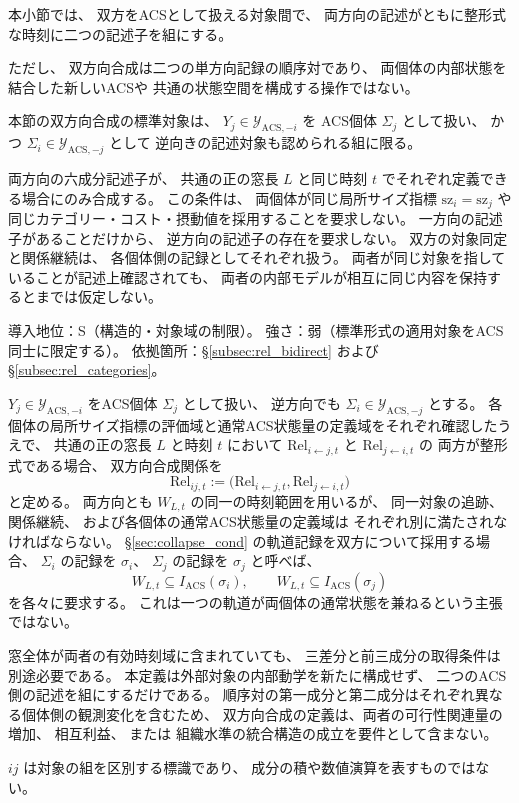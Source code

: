 本小節では、
双方をACSとして扱える対象間で、
両方向の記述がともに整形式な時刻に二つの記述子を組にする。

ただし、
双方向合成は二つの単方向記録の順序対であり、
両個体の内部状態を結合した新しいACSや
共通の状態空間を構成する操作ではない。

\begin{assumption}[双方向合成関係の標準対象]
\label{ass:bidirect_scope}
本節の双方向合成の標準対象は、
$Y_j\in\mathcal Y_{\mathrm{ACS},-i}$ を
ACS個体 $\Sigma_j$ として扱い、
かつ $\Sigma_i\in\mathcal Y_{\mathrm{ACS},-j}$ として
逆向きの記述対象も認められる組に限る。

両方向の六成分記述子が、
共通の正の窓長 $L$ と同じ時刻 $t$ でそれぞれ定義できる場合にのみ合成する。
この条件は、
両個体が同じ局所サイズ指標 $\mathrm{sz}_i=\mathrm{sz}_j$ や
同じカテゴリー・コスト・摂動値を採用することを要求しない。
一方向の記述子があることだけから、
逆方向の記述子の存在を要求しない。
双方の対象同定と関係継続は、
各個体側の記録としてそれぞれ扱う。
両者が同じ対象を指していることが記述上確認されても、
両者の内部モデルが相互に同じ内容を保持するとまでは仮定しない。

導入地位：S（構造的・対象域の制限）。
強さ：弱（標準形式の適用対象をACS同士に限定する）。
依拠箇所：\S\ref{subsec:rel_bidirect} および \S\ref{subsec:rel_categories}。
\end{assumption}

\begin{definition}
\label{def:bidirect_relation}
$Y_j\in\mathcal Y_{\mathrm{ACS},-i}$ をACS個体 $\Sigma_j$ として扱い、
逆方向でも $\Sigma_i\in\mathcal Y_{\mathrm{ACS},-j}$ とする。
各個体の局所サイズ指標の評価域と通常ACS状態量の定義域をそれぞれ確認したうえで、
共通の正の窓長 $L$ と時刻 $t$ において
$\mathrm{Rel}_{i\leftarrow j,t}$ と $\mathrm{Rel}_{j\leftarrow i,t}$ の
両方が整形式である場合、
双方向合成関係を
\[
 \mathrm{Rel}_{ij,t}:=
 \bigl(\mathrm{Rel}_{i\leftarrow j,t},\mathrm{Rel}_{j\leftarrow i,t}\bigr)
\]
と定める。
両方向とも $W_{L,t}$ の同一の時刻範囲を用いるが、
同一対象の追跡、
関係継続、
および各個体の通常ACS状態量の定義域は
それぞれ別に満たされなければならない。
\S\ref{sec:collapse_cond} の軌道記録を双方について採用する場合、
$\Sigma_i$ の記録を $\sigma_i$、
$\Sigma_j$ の記録を $\sigma_j$ と呼べば、
\[
 W_{L,t}\subseteq I_{\mathrm{ACS}}(\sigma_i),\qquad
 W_{L,t}\subseteq I_{\mathrm{ACS}}(\sigma_j)
\]
を各々に要求する。
これは一つの軌道が両個体の通常状態を兼ねるという主張ではない。

窓全体が両者の有効時刻域に含まれていても、
三差分と前三成分の取得条件は別途必要である。
本定義は外部対象の内部動学を新たに構成せず、
二つのACS側の記述を組にするだけである。
順序対の第一成分と第二成分はそれぞれ異なる個体側の観測変化を含むため、
双方向合成の定義は、両者の可行性関連量の増加、
相互利益、
または
組織水準の統合構造の成立を要件として含まない。

$ij$ は対象の組を区別する標識であり、
成分の積や数値演算を表すものではない。
\end{definition}

